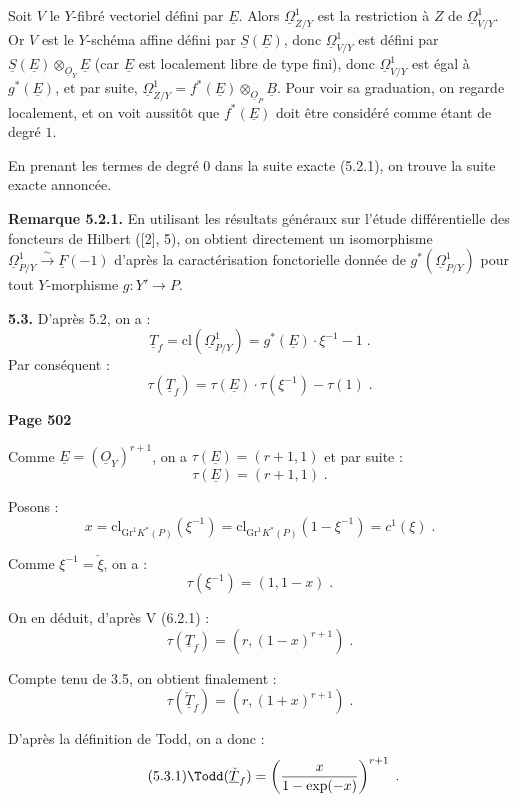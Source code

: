 Soit $V$ le $Y$-fibr\'e vectoriel d\'efini par $\underline{E}$. Alors $\underline{\Omega}^1_{Z/Y}$ est la restriction \`a $Z$ de $\underline{\Omega}^1_{V/Y}$. Or $V$ est le $Y$-sch\'ema affine d\'efini par $\underline{S}(\underline{E})$, donc $\underline{\Omega}^1_{V/Y}$ est d\'efini par $\underline{S}(\underline{E}) \otimes_{\underline{O}_Y} \underline{E}$ (car $\underline{E}$ est localement libre de type fini), donc $\underline{\Omega}^1_{V/Y}$ est \'egal \`a $g^*(\underline{E})$, et par suite, $\underline{\Omega}^1_{Z/Y} = f^*(\underline{E}) \otimes_{\underline{O}_P} \underline{B}$. Pour voir sa graduation, on regarde localement, et on voit aussit\^ot que $f^*(\underline{E})$ doit \^etre consid\'er\'e comme \'etant de degr\'e $1$.

En prenant les termes de degr\'e $0$ dans la suite exacte (5.2.1), on trouve la suite exacte annonc\'ee.

\smallskip
\noindent\textbf{Remarque 5.2.1.} En utilisant les r\'esultats g\'en\'eraux sur l'\'etude diff\'erentielle des foncteurs de Hilbert ([2], 5), on obtient directement un isomorphisme $\underline{\Omega}^1_{P/Y} \xrightarrow{\sim} \underline{F}(-1)$ d'apr\`es la caract\'erisation fonctorielle donn\'ee de $g^*(\underline{\Omega}^1_{P/Y})$ pour tout $Y$-morphisme $g : Y' \longrightarrow P$.

\medskip
\noindent\textbf{5.3.} D'apr\`es 5.2, on a :
\[
\underline{T}_f = \mathrm{cl}(\underline{\Omega}^1_{P/Y}) = g^*(\underline{E}) \cdot \xi^{-1} - 1\;.
\]
Par cons\'equent :
\[
\tau(\underline{T}_f) = \tau(\underline{E}) \cdot \tau(\xi^{-1}) - \tau(1)\;.
\]

\newpage
\noindent\textbf{Page 502}

Comme $\underline{E} = (\underline{O}_Y)^{r+1}$, on a $\tau(\underline{E}) = (r+1, 1)$ et par suite :
\[
\tau(\underline{E}) = (r+1, 1)\;.
\]

Posons :
\[
x = \mathrm{cl}_{\mathrm{Gr}^1 K^*(P)}(\xi^{-1}) = \mathrm{cl}_{\mathrm{Gr}^1 K^*(P)}(1 - \xi^{-1}) = c^1(\xi)\;.
\]

Comme $\xi^{-1} = \check{\xi}$, on a :
\[
\tau(\xi^{-1}) = (1, 1-x)\;.
\]

On en d\'eduit, d'apr\`es V (6.2.1) :
\[
\tau(\underline{T}_f) = (r, (1-x)^{r+1})\;.
\]

Compte tenu de 3.5, on obtient finalement :
\[
\tau(\underline{\check{T}}_f) = (r, (1+x)^{r+1})\;.
\]

D'apr\`es la d\'efinition de Todd, on a donc :
\begin{equation}\tag{5.3.1}
\Todd(\underline{\check{T}}_f) = \left(\frac{x}{1 - \exp(-x)}\right)^{r+1}\;.
\end{equation}

